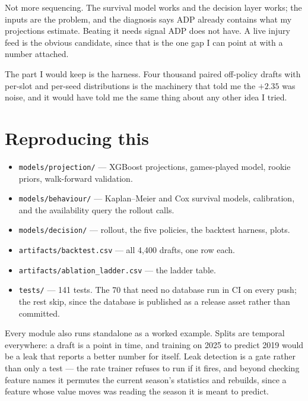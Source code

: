 \documentclass[11pt]{article}
\begin{document}
Not more sequencing. The survival model works and the decision layer works; the
inputs are the problem, and the diagnosis says ADP already contains what my
projections estimate. Beating it needs signal ADP does not have. A live
injury feed is the obvious candidate, since that is the one gap I can point at
with a number attached.

The part I would keep is the harness. Four thousand paired off-policy drafts with
per-slot and per-seed distributions is the machinery that told me the $+2.35$ was
noise, and it would have told me the same thing about any other idea I tried.

\section*{Reproducing this}

\begin{itemize}\itemsep2pt
\item \texttt{models/projection/} --- XGBoost projections, games-played model,
      rookie priors, walk-forward validation.
\item \texttt{models/behaviour/} --- Kaplan--Meier and Cox survival models,
      calibration, and the availability query the rollout calls.
\item \texttt{models/decision/} --- rollout, the five policies, the backtest
      harness, plots.
\item \texttt{artifacts/backtest.csv} --- all 4{,}400 drafts, one row each.
\item \texttt{artifacts/ablation\_ladder.csv} --- the ladder table.

\item \texttt{tests/} --- 141 tests. The 70 that need no database run in CI on
      every push; the rest skip, since the database is published as a release
      asset rather than committed.
\end{itemize}

Every module also runs standalone as a worked example. Splits are temporal
everywhere: a draft is a point in time, and training on 2025 to predict 2019 would
be a leak that reports a better number for itself. Leak detection is a gate rather
than only a test --- the rate trainer refuses to run if it fires, and beyond
checking feature names it permutes the current season's statistics and rebuilds,
since a feature whose value moves was reading the season it is meant to predict.
\end{document}
